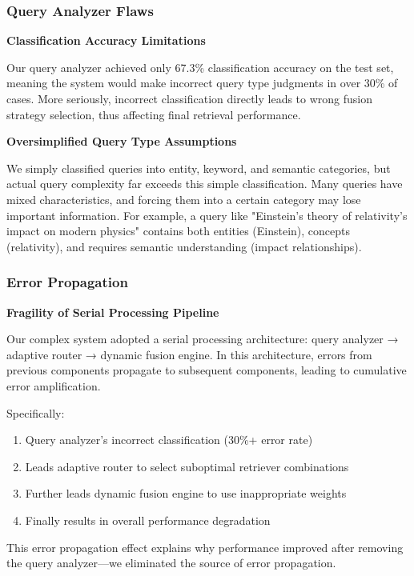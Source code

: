 \documentclass[letterpaper]{article} %
\begin{document}
\subsubsection{Query Analyzer Flaws}

\textbf{Classification Accuracy Limitations}

Our query analyzer achieved only 67.3\% classification accuracy on the test set, meaning the system would make incorrect query type judgments in over 30\% of cases. More seriously, incorrect classification directly leads to wrong fusion strategy selection, thus affecting final retrieval performance.

\textbf{Oversimplified Query Type Assumptions}

We simply classified queries into entity, keyword, and semantic categories, but actual query complexity far exceeds this simple classification. Many queries have mixed characteristics, and forcing them into a certain category may lose important information. For example, a query like "Einstein's theory of relativity's impact on modern physics" contains both entities (Einstein), concepts (relativity), and requires semantic understanding (impact relationships).

\subsubsection{Error Propagation}

\textbf{Fragility of Serial Processing Pipeline}

Our complex system adopted a serial processing architecture: query analyzer → adaptive router → dynamic fusion engine. In this architecture, errors from previous components propagate to subsequent components, leading to cumulative error amplification.

Specifically:
\begin{enumerate}
\item Query analyzer's incorrect classification (30\%+ error rate)
\item Leads adaptive router to select suboptimal retriever combinations
\item Further leads dynamic fusion engine to use inappropriate weights
\item Finally results in overall performance degradation
\end{enumerate}

This error propagation effect explains why performance improved after removing the query analyzer—we eliminated the source of error propagation.
\end{document}
